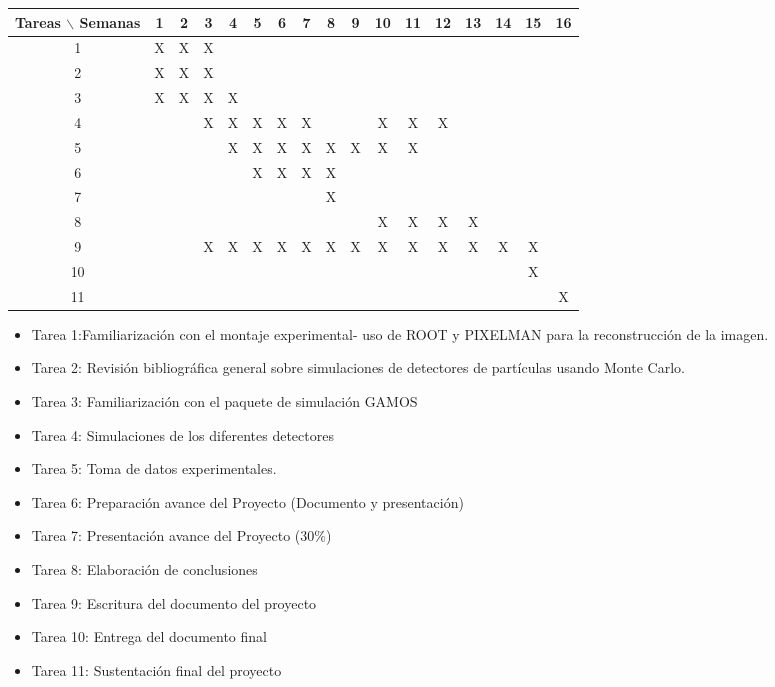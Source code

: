 \documentclass[12pt]{article}
\begin{document}
\begin{table}[htb]
	\begin{tabular}{|c|c|c|c|c|c|c|c|c|c|c|c|c|c|c|c|c| }
	\hline
	Tareas $\backslash$ Semanas & 1 & 2 & 3 & 4 & 5 & 6 & 7 & 8 & 9 & 10 & 11 & 12 & 13 & 14 & 15 & 16  \\
	\hline
	1 & X & X & X  &   &   &   &   &  &  &   &   &   &   &   &   &   \\\hline
	2 & X  & X & X &   & &  &  &   &   &  &  &  &   &  &  &   \\\hline
	3 & X & X & X & X &  &  &  &  &  &  &   &   &   &   &   &   \\\hline
	4 &   &   &  X & X  & X & X  &  X &   &  & X  & X  & X &   &   &  &   \\\hline
5 &   &   &   &  X & X & X  & X  & X  & X & X  &  X &  &   &   &  &   \\\hline
6 &   &   &   &   & X  & X  & X  &  X &  &   &   &  &   &   &  &  \\\hline
7 &   &   &   &   &  &   &   &  X &  &   &   &  &   &   &  &  \\\hline
8 &   &   &   &   &  &   &   &   &  & X  & X  & X &  X &   &  &   \\\hline
9 &   &   & X  &  X & X & X  & X  & X  & X & X  & X  & X & X  & X  & X &  \\\hline
10 &   &   &   &  &  &   &   &   &  &   &   &  &   &   & X &  \\\hline
11 &   &   &   &   &  &   &   &   &  &   &   &  &   &   &  & X \\\hline




	\end{tabular}
\end{table}
\vspace{1mm}

\begin{itemize}
\item Tarea 1:Familiarización con el montaje experimental- uso de ROOT y PIXELMAN para la reconstrucción de la imagen.

	\item Tarea 2: Revisión bibliográfica general sobre simulaciones de detectores de partículas usando Monte Carlo.  
	\item Tarea 3: Familiarización con el paquete de simulación GAMOS
	\item Tarea 4: Simulaciones de los diferentes detectores 
	\item Tarea 5: Toma de datos experimentales.
\item Tarea 6: Preparación avance del Proyecto (Documento y presentación) 
\item Tarea 7: Presentación avance del Proyecto (30$\%$)

\item Tarea 8: Elaboración de conclusiones
\item Tarea 9: Escritura del documento del proyecto
\item Tarea 10: Entrega del documento final 
  
\item Tarea 11: Sustentación final del proyecto
  
  
\end{itemize}
\end{document}
